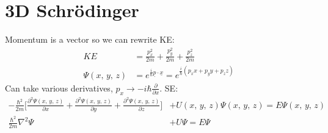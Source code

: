 \documentclass[a4paper, 11pt, normalem]{report}
\begin{document}
\section{3D Schr\"{o}dinger}
Momentum is a vector so we can rewrite KE:
\begin{align}
    KE &= \frac{p_{x}^{2}}{2m} + \frac{p_{y}^{2}}{2m} + \frac{p_{z}^{2}}{2m} \\
    \Psi(x,\,y,\,z) &= e^{\tfrac{i}{\hbar}\underline{p}\cdot\underline{x}} = e^{\tfrac{i}{\hbar}(p_{x}x + p_{y}y + p_{z}z)}
\end{align}
Can take various derivatives, $p_{x} \rightarrow -i\hbar\frac{\partial}{\partial x}$.
SE:
\begin{align}
    -\frac{\hbar^{2}}{2m}\Bigg[\frac{\partial^{2}\Psi(x,\,y,\,z)}{\partial x} + \frac{\partial^{2}\Psi(x,\,y,\,z)}{\partial y} + \frac{\partial^{2}\Psi(x,\,y,\,z)}{\partial z}\Bigg] &+ U(x,\,y,\,z)\Psi(x,\,y,\,z) = E\Psi(x,\,y,\,z) \\
    \frac{\hbar^{2}}{2m}\nabla^{2}\Psi &+ U\Psi = E\Psi
\end{align}
\end{document}
